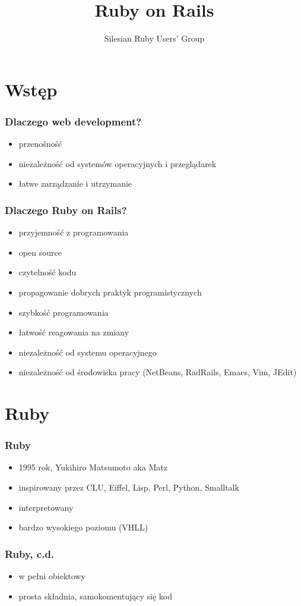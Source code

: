 \documentclass[12t]{beamer}
\author{Silesian Ruby Users' Group}
\title{Ruby on Rails}
\begin{document}
\frame{\titlepage}

\section{Wstęp}
\begin{frame}
  \frametitle{Dlaczego web development?}
  \begin{itemize}
  \item przenośność
  \item niezależność od systemów operacyjnych i przeglądarek
  \item łatwe zarządzanie i utrzymanie
  \end{itemize}
\end{frame}

\begin{frame}
  \frametitle{Dlaczego Ruby on Rails?}
  \begin{itemize}
  \item przyjemność z programowania
  \item open source
  \item czytelność kodu
  \item propagowanie dobrych praktyk programistycznych
  \item szybkość programowania
  \item łatwość reagowania na zmiany
  \item niezależność od systemu operacyjnego
  \item niezależność od środowiska pracy (NetBeans, RadRails, Emacs,
    Vim, JEdit)
  \end{itemize}
\end{frame}

\section{Ruby}
\begin{frame}
  \frametitle{Ruby}
  \begin{itemize}
  \item 1995 rok, Yukihiro Matsumoto aka Matz
  \item inspirowany przez CLU, Eiffel, Lisp, Perl, Python, Smalltalk
  \item interpretowany
  \item bardzo wysokiego poziomu (VHLL)
  \end{itemize}
\end{frame}

\begin{frame}
  \frametitle{Ruby, c.d.}
  \begin{itemize}
  \item w pełni obiektowy
  \item prosta składnia, samokomentujący się kod
	
  \end{itemize}
\end{frame}
\end{document}
